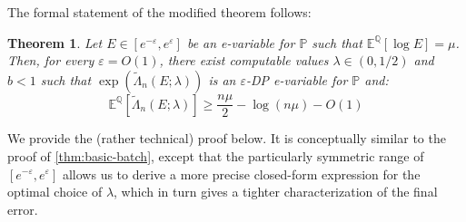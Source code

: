 \documentclass{article}
\newcommand{\Null}{\mathbb{P}}
\newcommand{\E}{\mathbb{E}}
\newcommand{\Alt}{\mathbb{Q}}
\newcommand{\eps}{\varepsilon}
\newtheorem{theorem}{Theorem}[section]
\begin{document}
The formal statement of the modified theorem follows:
\begin{theorem}\label{thm:basic-batch-symmetric}
    Let $E \in [e^{-\eps}, e^\eps]$ be an e-variable for $\Null$ such that $\E^\Alt[\log E] = \mu$. Then, for every $\eps = O(1)$, there exist computable values $\lambda \in (0, 1/2)$ and $b<1$ such that $\exp(\tilde \Lambda_n(E;\lambda))$ is an $\eps$-DP e-variable for $\Null$ and:
    \begin{equation*}
        \E^\Alt[\tilde \Lambda_n(E; \lambda)] \geq \frac{n\mu}{2} - \log(n\mu) - O(1)
    \end{equation*}
\end{theorem}

We provide the (rather technical) proof below. It is conceptually similar to the proof of \cref{thm:basic-batch}, except that the particularly symmetric range of $[e^{-\eps}, e^\eps]$ allows us to derive a more precise closed-form expression for the optimal choice of $\lambda$, which in turn gives a tighter characterization of the final error.
\end{document}
